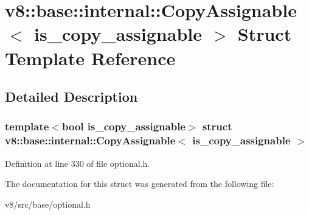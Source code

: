 \hypertarget{structv8_1_1base_1_1internal_1_1CopyAssignable}{}\section{v8\+:\+:base\+:\+:internal\+:\+:Copy\+Assignable$<$ is\+\_\+copy\+\_\+assignable $>$ Struct Template Reference}
\label{structv8_1_1base_1_1internal_1_1CopyAssignable}


\subsection{Detailed Description}
\subsubsection*{template$<$bool is\+\_\+copy\+\_\+assignable$>$\newline
struct v8\+::base\+::internal\+::\+Copy\+Assignable$<$ is\+\_\+copy\+\_\+assignable $>$}



Definition at line 330 of file optional.\+h.



The documentation for this struct was generated from the following file\+:\begin{DoxyCompactItemize}
\item 
v8/src/base/optional.\+h\end{DoxyCompactItemize}
